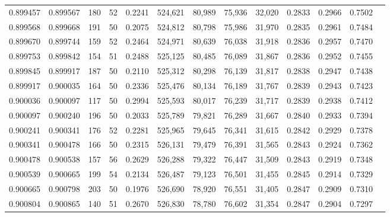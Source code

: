\begin{tabular}{rrrrrrrrrrrrr}
0.899457 & 0.899567 &   180 &  52 &                                     0.2241 & 524,621 &  80,989 &  75,936 &  32,020 & 0.2833 & 0.2966 & 0.7502 \\
0.899568 & 0.899668 &   191 &  50 &                                     0.2075 & 524,812 &  80,798 &  75,986 &  31,970 & 0.2835 & 0.2961 & 0.7484 \\
0.899670 & 0.899744 &   159 &  52 &                                     0.2464 & 524,971 &  80,639 &  76,038 &  31,918 & 0.2836 & 0.2957 & 0.7470 \\
0.899753 & 0.899842 &   154 &  51 &                                     0.2488 & 525,125 &  80,485 &  76,089 &  31,867 & 0.2836 & 0.2952 & 0.7455 \\
0.899845 & 0.899917 &   187 &  50 &                                     0.2110 & 525,312 &  80,298 &  76,139 &  31,817 & 0.2838 & 0.2947 & 0.7438 \\
0.899917 & 0.900035 &   164 &  50 &                                     0.2336 & 525,476 &  80,134 &  76,189 &  31,767 & 0.2839 & 0.2943 & 0.7423 \\
0.900036 & 0.900097 &   117 &  50 &                                     0.2994 & 525,593 &  80,017 &  76,239 &  31,717 & 0.2839 & 0.2938 & 0.7412 \\
0.900097 & 0.900240 &   196 &  50 &                                     0.2033 & 525,789 &  79,821 &  76,289 &  31,667 & 0.2840 & 0.2933 & 0.7394 \\
0.900241 & 0.900341 &   176 &  52 &                                     0.2281 & 525,965 &  79,645 &  76,341 &  31,615 & 0.2842 & 0.2929 & 0.7378 \\
0.900341 & 0.900478 &   166 &  50 &                                     0.2315 & 526,131 &  79,479 &  76,391 &  31,565 & 0.2843 & 0.2924 & 0.7362 \\
0.900478 & 0.900538 &   157 &  56 &                                     0.2629 & 526,288 &  79,322 &  76,447 &  31,509 & 0.2843 & 0.2919 & 0.7348 \\
0.900539 & 0.900665 &   199 &  54 &                                     0.2134 & 526,487 &  79,123 &  76,501 &  31,455 & 0.2845 & 0.2914 & 0.7329 \\
0.900665 & 0.900798 &   203 &  50 &                                     0.1976 & 526,690 &  78,920 &  76,551 &  31,405 & 0.2847 & 0.2909 & 0.7310 \\
0.900804 & 0.900865 &   140 &  51 &                                     0.2670 & 526,830 &  78,780 &  76,602 &  31,354 & 0.2847 & 0.2904 & 0.7297 \\

\end{tabular}
